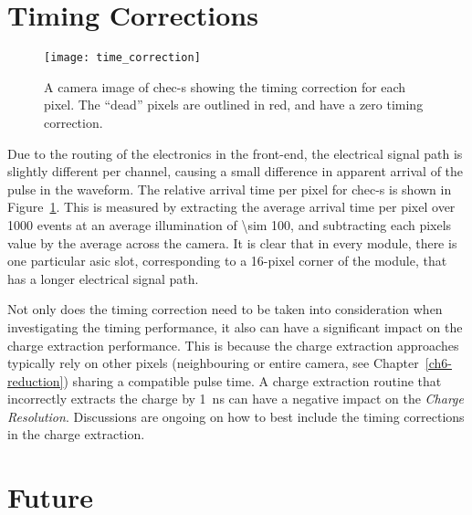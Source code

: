 \section{Timing Corrections} \label{section:timing_corrections}

\begin{figure}
	\centering
    \texttt{[image: time\_correction]} 
	\caption[Pulse timing correction for each pixel.]{A camera image of \gls{chec-s} showing the timing correction for each pixel. The ``dead'' pixels are outlined in red, and have a zero timing correction.}
	\label{fig:time_correction}
\end{figure}

Due to the routing of the electronics in the front-end, the electrical signal path is slightly different per channel, causing a small difference in apparent arrival of the pulse in the waveform. The relative arrival time per pixel for \gls{chec-s} is shown in Figure~\ref{fig:time_correction}. This is measured by extracting the average arrival time per pixel over 1000 events at an average illumination of \SI{\sim 100}{\pe}, and subtracting each pixels value by the average across the camera. It is clear that in every module, there is one particular \gls{asic} slot, corresponding to a 16-pixel corner of the module, that has a longer electrical signal path. 

Not only does the timing correction need to be taken into consideration when investigating the timing performance, it also can have a significant impact on the charge extraction performance. This is because the charge extraction approaches typically rely on other pixels (neighbouring or entire camera, see Chapter~\ref{ch6-reduction}) sharing a compatible pulse time. A charge extraction routine that incorrectly extracts the charge by \SI{1}{ns} can have a negative impact on the \textit{Charge Resolution}. Discussions are ongoing on how to best include the timing corrections in the charge extraction.

\section{Future}

